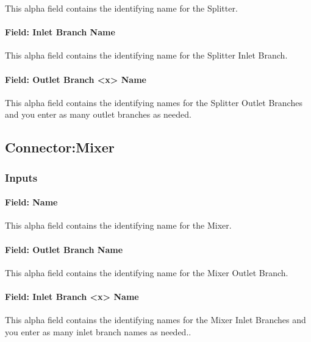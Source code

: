 This alpha field contains the identifying name for the Splitter.

\paragraph{Field: Inlet Branch Name}\label{field-inlet-branch-name}

This alpha field contains the identifying name for the Splitter Inlet Branch.

\paragraph{Field: Outlet Branch \textless{}x\textgreater{} Name}\label{field-outlet-branch-x-name}

This alpha field contains the identifying names for the Splitter Outlet Branches and you enter as many outlet branches as needed.

\subsection{Connector:Mixer}\label{connectormixer}

\subsubsection{Inputs}\label{inputs-1-031}

\paragraph{Field: Name}\label{field-name-1-030}

This alpha field contains the identifying name for the Mixer.

\paragraph{Field: Outlet Branch Name}\label{field-outlet-branch-name}

This alpha field contains the identifying name for the Mixer Outlet Branch.

\paragraph{Field: Inlet Branch \textless{}x\textgreater{} Name}\label{field-inlet-branch-x-name}

This alpha field contains the identifying names for the Mixer Inlet Branches and you enter as many inlet branch names as needed..

